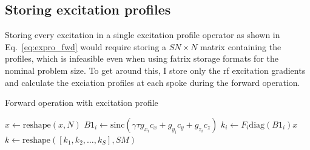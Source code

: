 \documentclass[11pt]{article}
\begin{document}
\subsection*{Storing excitation profiles}
Storing every excitation in a single excitation profile operator as shown in Eq.~\ref{eq:expro_fwd} would require storing
a $SN \times N$ matrix containing the profiles, which is infeasible even when using fatrix storage formats for the nominal problem size.
To get around this, I store only the rf excitation gradients and calculate the exciation profiles at each spoke during the forward operation.
\begin{algorithm}[H]
  \caption{Forward operation with excitation profile}
  \begin{algorithmic}
    \STATE $x \leftarrow \text{reshape}(x, N)$
      \STATE $B1_i \leftarrow \text{sinc} (\gamma \tau g_{x_i}c_x + g_{y_i}c_y + g_{z_i}c_z)$
      \STATE $k_i \leftarrow F_i \text{diag}(B1_i) x$
    \ENDFOR
    \STATE $k \leftarrow \text{reshape}([k_1, k_2, \ldots, k_S], SM)$
  \end{algorithmic}
\end{algorithm}
\end{document}
